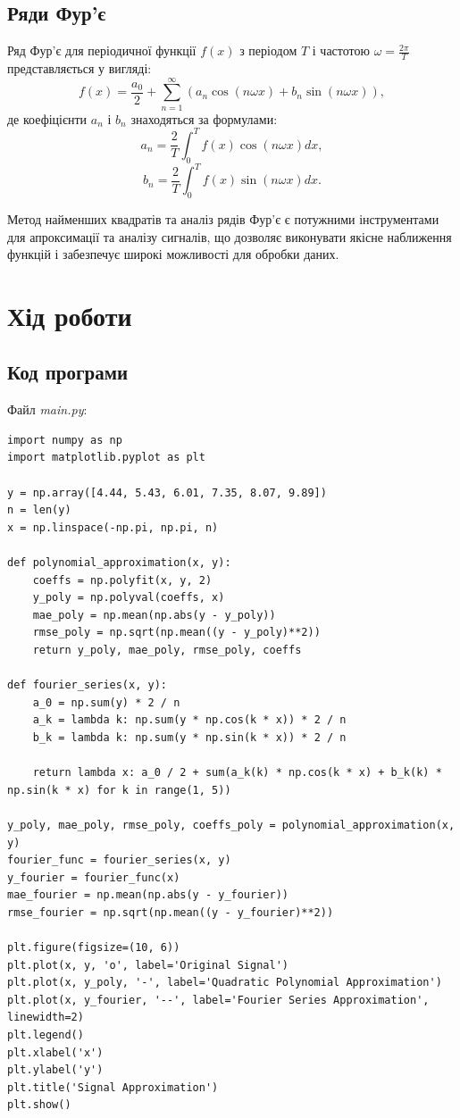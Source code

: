 \documentclass[oneside,14pt]{extarticle}
\begin{document}
\begin{normalsize}
\subsection*{Ряди Фур'є}

Ряд Фур'є для періодичної функції \(f(x)\) з періодом \(T\) і частотою \(\omega = \frac{2\pi}{T}\) представляється у вигляді:
\[f(x) = \frac{a_0}{2} + \sum_{n=1}^{\infty} \left( a_n \cos(n\omega x) + b_n \sin(n\omega x) \right),\]
де коефіцієнти \(a_n\) і \(b_n\) знаходяться за формулами:
\[a_n = \frac{2}{T} \int_{0}^{T} f(x) \cos(n\omega x) dx,\]
\[b_n = \frac{2}{T} \int_{0}^{T} f(x) \sin(n\omega x) dx.\]

Метод найменших квадратів та аналіз рядів Фур'є є потужними інструментами для апроксимації та аналізу сигналів, що дозволяє виконувати якісне наближення функцій і забезпечує широкі можливості для обробки даних.

	\section*{Хід роботи}	

	\subsection*{Код програми}
	Файл \textit{main.py}:
	{\small
		\begin{lstlisting}
import numpy as np
import matplotlib.pyplot as plt

y = np.array([4.44, 5.43, 6.01, 7.35, 8.07, 9.89])
n = len(y)
x = np.linspace(-np.pi, np.pi, n)

def polynomial_approximation(x, y):
    coeffs = np.polyfit(x, y, 2)
    y_poly = np.polyval(coeffs, x)
    mae_poly = np.mean(np.abs(y - y_poly))
    rmse_poly = np.sqrt(np.mean((y - y_poly)**2))
    return y_poly, mae_poly, rmse_poly, coeffs

def fourier_series(x, y):
    a_0 = np.sum(y) * 2 / n
    a_k = lambda k: np.sum(y * np.cos(k * x)) * 2 / n
    b_k = lambda k: np.sum(y * np.sin(k * x)) * 2 / n
    
    return lambda x: a_0 / 2 + sum(a_k(k) * np.cos(k * x) + b_k(k) * np.sin(k * x) for k in range(1, 5))

y_poly, mae_poly, rmse_poly, coeffs_poly = polynomial_approximation(x, y)
fourier_func = fourier_series(x, y)
y_fourier = fourier_func(x)
mae_fourier = np.mean(np.abs(y - y_fourier))
rmse_fourier = np.sqrt(np.mean((y - y_fourier)**2))

plt.figure(figsize=(10, 6))
plt.plot(x, y, 'o', label='Original Signal')
plt.plot(x, y_poly, '-', label='Quadratic Polynomial Approximation')
plt.plot(x, y_fourier, '--', label='Fourier Series Approximation', linewidth=2)
plt.legend()
plt.xlabel('x')
plt.ylabel('y')
plt.title('Signal Approximation')
plt.show()


\end{lstlisting}}
\end{normalsize}
\end{document}

